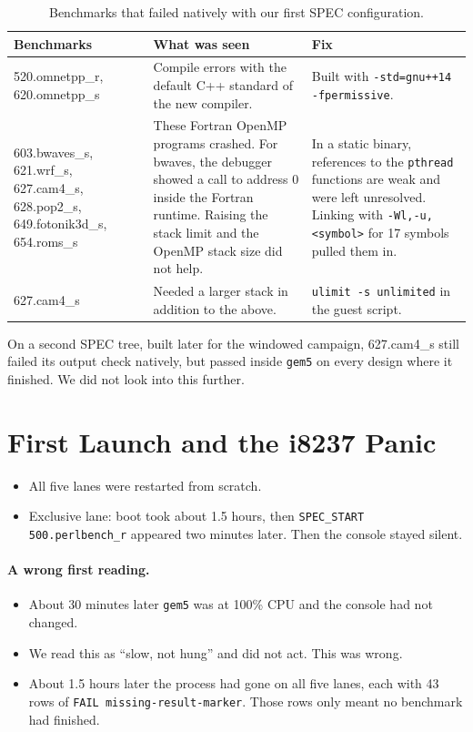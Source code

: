 \begin{table}[htbp]
\centering
\small
\caption{Benchmarks that failed natively with our first SPEC configuration.}
\label{tab:chr_native}
\begin{tabularx}{\textwidth}{>{\raggedright\arraybackslash}p{3.6cm} X X}
\toprule
\textbf{Benchmarks} & \textbf{What was seen} & \textbf{Fix} \\
\midrule
520.omnetpp\_r, 620.omnetpp\_s & Compile errors with the default C++ standard of the new compiler. & Built with \texttt{-std=gnu++14 -fpermissive}. \\
603.bwaves\_s, 621.wrf\_s, 627.cam4\_s, 628.pop2\_s, 649.fotonik3d\_s, 654.roms\_s & These Fortran OpenMP programs crashed. For bwaves, the debugger showed a call to address 0 inside the Fortran runtime. Raising the stack limit and the OpenMP stack size did not help. & In a static binary, references to the \texttt{pthread} functions are weak and were left unresolved. Linking with \texttt{-Wl,-u,<symbol>} for 17 symbols pulled them in. \\
627.cam4\_s & Needed a larger stack in addition to the above. & \texttt{ulimit -s unlimited} in the guest script. \\
\bottomrule
\end{tabularx}
\end{table}

\noindent On a second SPEC tree, built later for the windowed campaign, 627.cam4\_s still failed its output check natively, but passed inside \texttt{gem5} on every design where it finished. We did not look into this further.

\section{First Launch and the i8237 Panic}
\label{sec:chr_i8237}

\begin{itemize}
    \item All five lanes were restarted from scratch.
    \item Exclusive lane: boot took about 1.5 hours, then \texttt{SPEC\_START 500.perlbench\_r} appeared two minutes later. Then the console stayed silent.
\end{itemize}

\paragraph{A wrong first reading.}
\begin{itemize}
    \item About 30 minutes later \texttt{gem5} was at 100\% CPU and the console had not changed.
    \item We read this as ``slow, not hung'' and did not act. This was wrong.
    \item About 1.5 hours later the process had gone on all five lanes, each with 43 rows of \texttt{FAIL missing-result-marker}. Those rows only meant no benchmark had finished.
\end{itemize}

